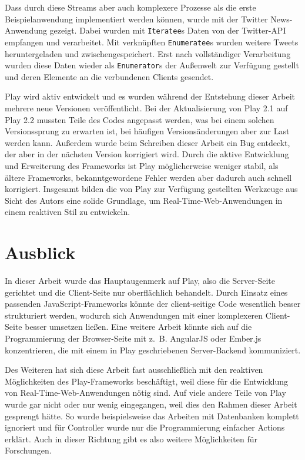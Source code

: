 Dass durch diese Streams aber auch komplexere Prozesse als die erste Beispielanwendung implementiert werden können, wurde mit der Twitter News-Anwendung gezeigt.
Dabei wurden mit \lstinline|Iteratee|s Daten von der Twitter-API empfangen und verarbeitet.
Mit verknüpften \lstinline|Enumeratee|s wurden weitere Tweets heruntergeladen und zwischengespeichert.
Erst nach vollständiger Verarbeitung wurden diese Daten wieder als \lstinline|Enumerator|s der Außenwelt zur Verfügung gestellt und deren Elemente an die verbundenen Clients gesendet.

Play wird aktiv entwickelt und es wurden während der Entstehung dieser Arbeit mehrere neue Versionen veröffentlicht.
Bei der Aktualisierung von Play 2.1 auf Play 2.2 mussten Teile des Codes angepasst werden, was bei einem solchen Versionssprung zu erwarten ist, bei häufigen Versionsänderungen aber zur Last werden kann.
Außerdem wurde beim Schreiben dieser Arbeit ein Bug entdeckt, der aber in der nächsten Version korrigiert wird.
Durch die aktive Entwicklung und Erweiterung des Frameworks ist Play möglicherweise weniger stabil, als ältere Frameworks, bekanntgewordene Fehler werden aber dadurch auch schnell korrigiert.
Insgesamt bilden die von Play zur Verfügung gestellten Werkzeuge aus Sicht des Autors eine solide Grundlage, um Real-Time-Web-Anwendungen in einem reaktiven Stil zu entwickeln.


\section{Ausblick} %
\label{sec:ausblick}

In dieser Arbeit wurde das Hauptaugenmerk auf Play, also die Server-Seite gerichtet und die Client-Seite nur oberflächlich behandelt.
Durch Einsatz eines passenden JavaScript-Frameworks könnte der client-seitige Code wesentlich besser strukturiert werden, wodurch sich Anwendungen mit einer komplexeren Client-Seite besser umsetzen ließen.
Eine weitere Arbeit könnte sich auf die Programmierung der Browser-Seite mit z.~B. AngularJS \cite[vgl.][]{angular_js} oder \mbox{Ember.js} \cite[vgl.][]{ember_js} konzentrieren, die mit einem in Play geschriebenen Server-Backend kommuniziert. %

Des Weiteren hat sich diese Arbeit fast ausschließlich mit den reaktiven Möglichkeiten des Play-Frameworks beschäftigt, weil diese für die Entwicklung von Real-Time-Web-Anwendungen nötig sind.
Auf viele andere Teile von Play wurde gar nicht oder nur wenig eingegangen, weil dies den Rahmen dieser Arbeit gesprengt hätte.
So wurde beispielsweise das Arbeiten mit Datenbanken komplett ignoriert und für Controller wurde nur die Programmierung einfacher Actions erklärt.
Auch in dieser Richtung gibt es also weitere Möglichkeiten für Forschungen.


